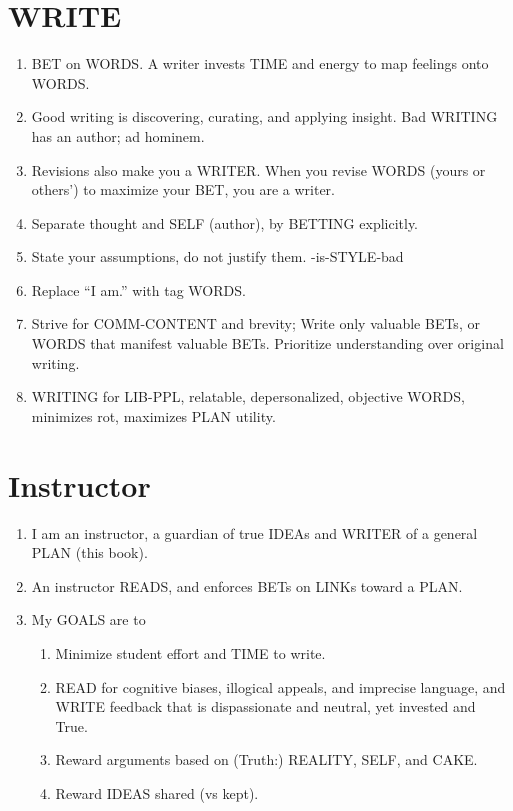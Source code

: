 \documentclass[
]{book}
\providecommand{\tightlist}{%
  \setlength{\itemsep}{0pt}\setlength{\parskip}{0pt}}
\begin{document}
\hypertarget{write}{%
\section{WRITE}\label{write}}

\begin{enumerate}
\def\labelenumi{\arabic{enumi}.}
\setcounter{enumi}{75}
\tightlist
\item
  BET on WORDS. A writer invests TIME and energy to map feelings onto
  WORDS.
\item
  Good writing is discovering, curating, and applying insight. Bad
  WRITING has an author; ad hominem.
\item
  Revisions also make you a WRITER. When you revise WORDS (yours or
  others') to maximize your BET, you are a writer.
\item
  Separate thought and SELF (author), by BETTING explicitly.
\item
  State your assumptions, do not justify them. -is-STYLE-bad
\item
  Replace ``I am.'' with tag WORDS.
\item
  Strive for COMM-CONTENT and brevity; Write only valuable BETs, or
  WORDS that manifest valuable BETs. Prioritize understanding over
  original writing.
\item
  WRITING for LIB-PPL, relatable, depersonalized, objective WORDS,
  minimizes rot, maximizes PLAN utility.
\end{enumerate}

\hypertarget{instructor}{%
\section{Instructor}\label{instructor}}

\begin{enumerate}
\def\labelenumi{\arabic{enumi}.}
\setcounter{enumi}{83}
\tightlist
\item
  I am an instructor, a guardian of true IDEAs and WRITER of a general
  PLAN (this book).
\item
  An instructor READS, and enforces BETs on LINKs toward a PLAN.
\item
  My GOALS are to

  \begin{enumerate}
  \def\labelenumii{\arabic{enumii}.}
  \tightlist
  \item
    Minimize student effort and TIME to write.
  \item
    READ for cognitive biases, illogical appeals, and imprecise
    language, and WRITE feedback that is dispassionate and neutral,
    yet invested and True.
  \item
    Reward arguments based on (Truth:) REALITY, SELF, and CAKE.
  \item
    Reward IDEAS shared (vs kept).
  \end{enumerate}
\end{enumerate}
\end{document}
